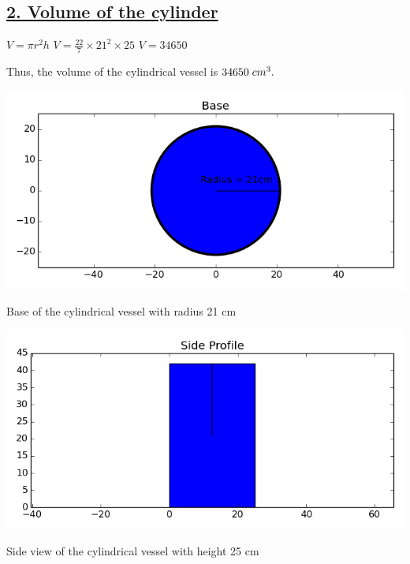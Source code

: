 \documentclass[journal,12pt,twocolumn]{IEEEtran}
\begin{document}
\subsection*{\underline{\textbf{2. Volume of the cylinder}}}
\vspace{2mm}
$V = \pi{r^2h}$
\vspace{1mm}
$V = \frac{22}{7}\times21^2\times25$
\vspace{1mm}
$V = 34650$
\vspace{1mm}
\begin{center}
    {Thus, the volume of the cylindrical vessel is $34650 \hspace{1mm} cm^3.$}
\end{center}
\includegraphics[width = \columnwidth]{Figures/Base.png}
\begin{center}
Base of the cylindrical vessel with radius 21 cm
\end{center}
\includegraphics[width = \columnwidth]{Figures/Side Profile.png}
\begin{center}
Side view of the cylindrical vessel with height 25 cm
\end{center}
\end{document}
